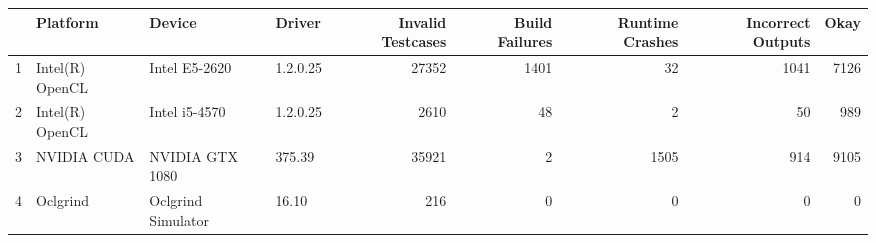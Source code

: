 \begin{tabular}{llllrrrrr}
\toprule
{} &         Platform &              Device &    Driver &  Invalid Testcases &  Build Failures &  Runtime Crashes &  Incorrect Outputs &  Okay \\
\midrule
1 &  Intel(R) OpenCL &       Intel E5-2620 &  1.2.0.25 &              27352 &            1401 &               32 &               1041 &  7126 \\
2 &  Intel(R) OpenCL &       Intel i5-4570 &  1.2.0.25 &               2610 &              48 &                2 &                 50 &   989 \\
3 &      NVIDIA CUDA &     NVIDIA GTX 1080 &    375.39 &              35921 &               2 &             1505 &                914 &  9105 \\
4 &         Oclgrind &  Oclgrind Simulator &     16.10 &                216 &               0 &                0 &                  0 &     0 \\
\bottomrule
\end{tabular}
